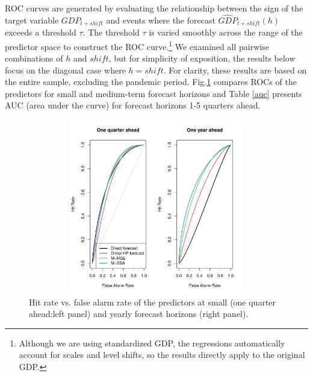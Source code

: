 \documentclass[11pt,a4paper]{article}
\begin{document}
ROC curves are generated by evaluating the relationship between the sign of the target variable $GDP_{t+shift}$  and events where the forecast $\hat{GDP}_{t+shift}(h)$ exceeds a threshold $\tau$. The threshold $\tau$ is varied smoothly across the range of the predictor space to construct the ROC curve.\footnote{Although we are using standardized GDP, the regressions automatically account for scales and level shifts, so the results directly apply to the original GDP.} We examined all pairwise combinations of $h$ and $shift$, but for simplicity of exposition, the results below focus on the diagonal case where $h=shift$. 
For clarity, these results are based on the entire sample, excluding the pandemic period. Fig.\ref{ROC_GDP_shift_1_4} compares ROCs of the predictors for small and medium-term forecast horizons and Table \ref{auc} presents AUC (area under the curve) for forecast horizons 1-5 quarters ahead.
\begin{figure}[h]\begin{center}\includegraphics[height=3in, width=5in]{./Figures/ROC_GDP_shift_1_4.pdf}\caption{Hit rate vs. false alarm rate of the predictors at small (one quarter ahead:left panel) and yearly forecast horizons (right panel).\label{ROC_GDP_shift_1_4}}\end{center}\end{figure}
\end{document}

